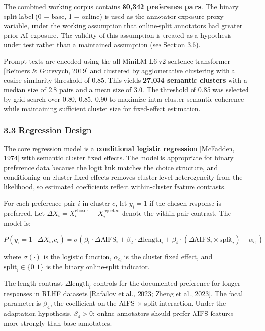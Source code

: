 The combined working corpus contains \textbf{80,342 preference pairs}. The binary split label (0 = base, 1 = online) is used as the annotator-exposure proxy variable, under the working assumption that online-split annotators had greater prior AI exposure. The validity of this assumption is treated as a hypothesis under test rather than a maintained assumption (see Section 3.5).

Prompt texts are encoded using the all-MiniLM-L6-v2 sentence transformer [Reimers \& Gurevych, 2019] and clustered by agglomerative clustering with a cosine similarity threshold of 0.85. This yields \textbf{27,034 semantic clusters} with a median size of 2.8 pairs and a mean size of 3.0. The threshold of 0.85 was selected by grid search over {0.80, 0.85, 0.90} to maximize intra-cluster semantic coherence while maintaining sufficient cluster size for fixed-effect estimation.

\subsubsection{3.3 Regression Design}

The core regression model is a \textbf{conditional logistic regression} [McFadden, 1974] with semantic cluster fixed effects. The model is appropriate for binary preference data because the logit link matches the choice structure, and conditioning on cluster fixed effects removes cluster-level heterogeneity from the likelihood, so estimated coefficients reflect within-cluster feature contrasts.

For each preference pair $i$ in cluster $c$, let $y_i = 1$ if the chosen response is preferred. Let $\Delta X_i = X_i^{\text{chosen}} - X_i^{\text{rejected}}$ denote the within-pair contrast. The model is:

$$P(y_i = 1 \mid \Delta X_i, c_i) = \sigma\!\left(\beta_1 \cdot \Delta\text{AIFS}_i + \beta_2 \cdot \Delta\text{length}_i + \beta_4 \cdot (\Delta\text{AIFS}_i \times \text{split}_i) + \alpha_{c_i}\right)$$

where $\sigma(\cdot)$ is the logistic function, $\alpha_{c_i}$ is the cluster fixed effect, and $\text{split}_i \in \{0, 1\}$ is the binary online-split indicator.

The length contrast $\Delta\text{length}_i$ controls for the documented preference for longer responses in RLHF datasets [Rafailov et al., 2023; Zheng et al., 2023]. The focal parameter is $\beta_4$, the coefficient on the AIFS × split interaction. Under the adaptation hypothesis, $\beta_4 > 0$: online annotators should prefer AIFS features more strongly than base annotators.

